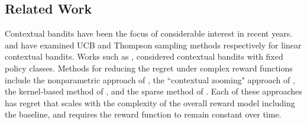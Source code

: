 \subsection{Related Work}


Contextual bandits have been the focus of considerable interest in recent years. \cite{chu2011contextual} and \cite{agrawal2013thompson} have examined UCB and Thompson sampling methods respectively for linear contextual bandits. Works such as \cite{seldin2011pac}, \cite{dudik2011efficient} considered contextual bandits with fixed policy classes. Methods for reducing the regret under complex reward functions include the nonparametric approach of \cite{may2012optimistic}, the ``contextual zooming" approach of \cite{slivkins2014contextual}, the kernel-based method of \cite{valko2013finite}, and the sparse method of \cite{bastani2015online}. 
Each of these approaches has regret that scales with the complexity of the overall reward model including the baseline, and requires the reward function to remain constant over time. 



